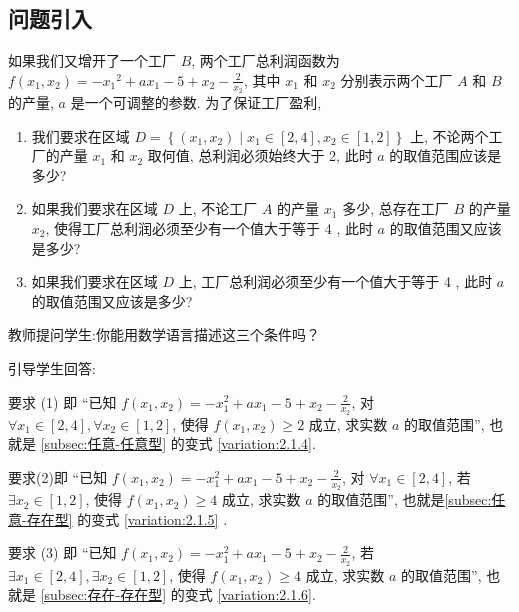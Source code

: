 \subsection{问题引入}
如果我们又增开了一个工厂 \(B\), 两个工厂总利润函数为 \(f(x_1, x_2)  =  - {x}_{1}{}^{2} + a{x}_{1} - 5 + {x}_{2} - \frac{2}{{x}_{2}}\), 其中 \({x}_{1}\) 和 \({x}_{2}\) 分别表示两个工厂 \(A\) 和 \(B\) 的产量, \(a\) 是一个可调整的参数. 为了保证工厂盈利, 

\begin{enumerate}[(1)]
  \item 我们要求在区域 \(D = \left\{  {\left( {{x}_{1}, {x}_{2}}\right)  \mid  {x}_{1} \in  \left\lbrack  {2, 4}\right\rbrack  , {x}_{2} \in  \left\lbrack  {1, 2}\right\rbrack  }\right\}\) 上, 不论两个工厂的产量 \({x}_{1}\) 和 \({x}_{2}\) 取何值, 总利润必须始终大于 2, 此时 \(a\) 的取值范围应该是多少?

  \item 如果我们要求在区域 \(D\) 上, 不论工厂 \(A\) 的产量 \({x}_{1}\) 多少, 总存在工厂 \(B\) 的产量 \({x}_{2}\), 使得工厂总利润必须至少有一个值大于等于 4 , 此时 \(a\) 的取值范围又应该是多少?
  
  \item 如果我们要求在区域 \(D\) 上, 工厂总利润必须至少有一个值大于等于 4 , 此时 \(a\) 的取值范围又应该是多少?
\end{enumerate}

教师提问学生:你能用数学语言描述这三个条件吗？

引导学生回答:

要求 (1) 即 “已知 \(f(x_1, x_2)  =  - {x}_{1}^{2} + a{x}_{1} - 5 + {x}_{2} - \frac{2}{{x}_{2}}\), 对 \(\forall {x}_{1} \in  \left\lbrack  {2, 4}\right\rbrack  , \forall {x}_{2} \in \left\lbrack  {1, 2}\right\rbrack\), 使得 \(f(x_1, x_2)  \geq  2\) 成立, 求实数 \(a\) 的取值范围”, 也就是 \ref{subsec:任意-任意型} 的变式 \ref{variation:2.1.4}.

要求(2)即 “已知 \(f(x_1, x_2)  =  - {x}_{1}^{2} + a{x}_{1} - 5 + {x}_{2} - \frac{2}{{x}_{2}}\), 对 \(\forall {x}_{1} \in  \left\lbrack  {2, 4}\right\rbrack\), 若 \(\exists {x}_{2} \in  \left\lbrack  {1, 2}\right\rbrack\), 使得 \(f(x_1, x_2)  \geq  4\) 成立, 求实数 \(a\) 的取值范围”, 也就是\ref{subsec:任意-存在型} 的变式 \ref{variation:2.1.5} .

要求 (3) 即 “已知 \(f(x_1, x_2)  =  - {x}_{1}^{2} + a{x}_{1} - 5 + {x}_{2} - \frac{2}{{x}_{2}}\), 若 \(\exists {x}_{1} \in  \left\lbrack  {2, 4}\right\rbrack  , \exists {x}_{2} \in \left\lbrack  {1, 2}\right\rbrack\), 使得 \(f(x_1, x_2)  \geq  4\) 成立, 求实数 \(a\) 的取值范围”, 也就是 \ref{subsec:存在-存在型} 的变式 \ref{variation:2.1.6}.



